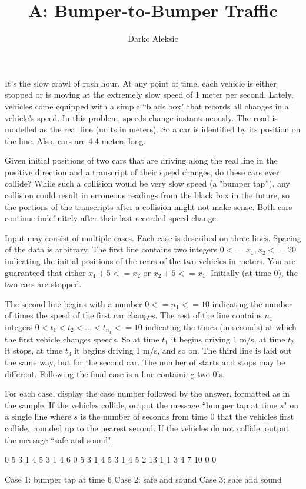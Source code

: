 \documentclass{article}
\title{A: Bumper-to-Bumper Traffic}
\author{Darko Aleksic}
\begin{document}
\begin{problemDescription}
It's the slow crawl of rush hour. At any point of time, each vehicle is either 
stopped or is moving at the extremely slow speed of 1 meter per second. Lately, 
vehicles come equipped with a simple ``black box" that records all changes in a 
vehicle's speed. In this problem, speeds change instantaneously.  The road is 
modelled as the real line (units in meters). So a car is identified by its 
position on the line.  Also, cars are 4.4 meters long.

Given initial positions of two cars that are driving along the real line in 
the positive direction and a transcript of their speed changes, do these cars 
ever collide? While such a collision would be very slow speed (a "bumper tap''), 
any collision could result in erroneous readings from the black box in the 
future, so the portions of the transcripts after a collision might not make sense.
Both cars continue indefinitely after their last recorded speed change.
\end{problemDescription}

\begin{inputDescription}
Input may consist of multiple cases.  Each case is described on three lines.
Spacing of the data is arbitrary.
The first line contains two integers $0 <= x_{1},x_{2} <= 20$ indicating the 
initial positions of the rears of the two vehicles in meters. You are guaranteed 
that either $x_{1} + 5 <= x_{2}$ or $x_{2} + 5 <= x_{1}$.  Initially (at time 0), 
the two cars are stopped.  

The second line begins with 
a number $0 <= n_{1} <= 10$ indicating the number of times the speed of the first
car changes. The rest of the line contains $n_{1}$ integers $0 < t_{1} < t_{2} < 
 ... < t_{n_{1}} <= 10$ indicating the times (in seconds) at which the first vehicle 
changes speeds. So at time $t_{1}$ it begins driving 1 m/s, at time $t_{2}$ it 
stops, at time $t_{3}$ it begins driving 1 m/s, and so on.  The third line 
is laid out the same way, but for the second car.  The number of starts and
stops may be different.  Following the final case is a line containing two 0's.
\end{inputDescription}

\begin{outputDescription}
For each case, display the case number followed by the answer, formatted as in
the sample.  If the vehicles collide, output the message ``bumper tap at time 
$s$" on a single line where $s$ is the number of seconds from time 0 that the 
vehicles first collide, rounded up to the nearest second. If the vehicles do 
not collide, output the message ``safe and sound".

\end{outputDescription}

\begin{sampleInput}
0 5
3 1 4 5
3 1 4 6
0 5
3 1 4 5
3 1 4 5
2 13
1 1
3   4   7   10
0 0
\end{sampleInput}
\begin{sampleOutput}
Case 1: bumper tap at time 6
Case 2: safe and sound
Case 3: safe and sound
\end{sampleOutput}
\end{document}
